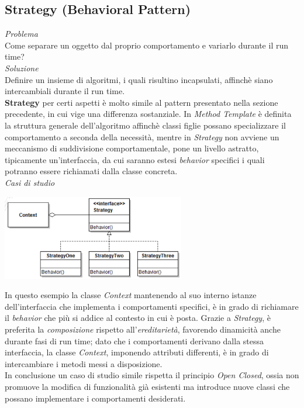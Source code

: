 \documentclass{article}
\begin{document}
\subsection*{Strategy (Behavioral Pattern)}
\large
\textit{Problema}\\
Come separare un oggetto dal proprio comportamento e variarlo durante il run time?\vspace*{7pt}\\
\textit{Soluzione}\\
Definire un insieme di algoritmi, i quali risultino incapsulati, affinchè siano intercambiali durante il run time.\vspace*{14pt}\\
\textbf{Strategy} per certi aspetti è molto simile al pattern presentato nella sezione precedente, in cui vige una differenza sostanziale. In \textit{Method Template} è definita la struttura generale dell'algoritmo affinchè classi figlie possano specializzare il comportamento a seconda della necessità, mentre in \textit{Strategy} non avviene un meccanismo di suddivisione comportamentale, pone un livello astratto, tipicamente un'interfaccia, da cui saranno estesi \textit{behavior} specifici i quali potranno essere richiamati dalla classe concreta.\vspace*{14pt}\\
\textit{Casi di studio}\\
\begin{center}
    \includegraphics[width=0.6\textwidth]{foto 6.png}
\end{center}
In questo esempio la classe \textit{Context} mantenendo al suo interno istanze dell'interfaccia che implementa i comportamenti specifici, è in grado di richiamare il \textit{behavior} che più si addice al contesto in cui è posta. Grazie a \textit{Strategy}, è preferita la \textit{composizione} rispetto all'\textit{ereditarietà}, favorendo dinamicità anche durante fasi di run time; dato che i comportamenti derivano dalla stessa interfaccia, la classe \textit{Context}, imponendo attributi differenti, è in grado di intercambiare i metodi messi a disposizione.\vspace*{7pt}\\
In conclusione un caso di studio simile rispetta il principio \textit{Open Closed}, ossia non promuove la modifica di funzionalità già esistenti ma introduce nuove classi che possano implementare i comportamenti desiderati.
\end{document}
